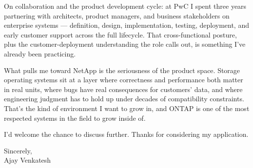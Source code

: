 \documentclass[letterpaper,11pt]{article}
\begin{document}
On collaboration and the product development cycle: at PwC I spent three years partnering with architects, product managers, and business stakeholders on enterprise systems --- definition, design, implementation, testing, deployment, and early customer support across the full lifecycle. That cross-functional posture, plus the customer-deployment understanding the role calls out, is something I've already been practicing.

What pulls me toward NetApp is the seriousness of the product space. Storage operating systems sit at a layer where correctness and performance both matter in real units, where bugs have real consequences for customers' data, and where engineering judgment has to hold up under decades of compatibility constraints. That's the kind of environment I want to grow in, and ONTAP is one of the most respected systems in the field to grow inside of.

I'd welcome the chance to discuss further. Thanks for considering my application.

\vspace{12pt}

Sincerely, \\
Ajay Venkatesh
\end{document}
